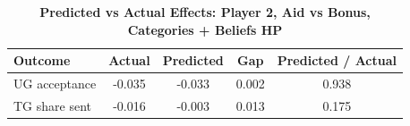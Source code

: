 \begin{table}[!htbp]
\centering
\caption{\textbf{Predicted vs Actual Effects: Player 2, Aid vs Bonus, Categories + Beliefs HP}}
\label{tab:cats_hp_aid_vs_bonus_fullpooled_p2_fit}
\begin{tabular}{lcccc}
\toprule
Outcome & Actual & Predicted & Gap & Predicted / Actual \\
\midrule
UG acceptance & -0.035 & -0.033 & 0.002 & 0.938 \\
TG share sent & -0.016 & -0.003 & 0.013 & 0.175 \\
\bottomrule
\end{tabular}
\end{table}
